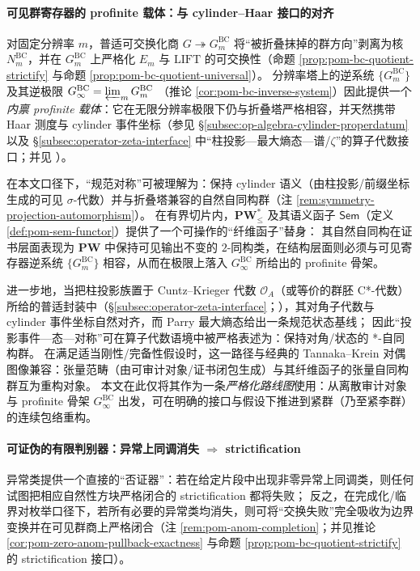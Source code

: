 \paragraph{可见群寄存器的 profinite 载体：与 cylinder--Haar 接口的对齐}
对固定分辨率 \(m\)，普适可交换化商 \(G\twoheadrightarrow G_m^{\mathrm{BC}}\) 将“被折叠抹掉的群方向”剥离为核 \(N_m^{\mathrm{BC}}\)，并在 \(G_m^{\mathrm{BC}}\) 上严格化 \(E_m\) 与 \(\mathrm{LIFT}\) 的可交换性（命题 \ref{prop:pom-bc-quotient-strictify} 与命题 \ref{prop:pom-bc-quotient-universal}）。
分辨率塔上的逆系统 \(\{G_m^{\mathrm{BC}}\}\) 及其逆极限
\(
G_\infty^{\mathrm{BC}}=\varprojlim_m G_m^{\mathrm{BC}}
\)
（推论 \ref{cor:pom-bc-inverse-system}）因此提供一个\emph{内禀 profinite 载体}：它在无限分辨率极限下仍与折叠塔严格相容，并天然携带 Haar 测度与 cylinder 事件坐标（参见 \S\ref{subsec:op-algebra-cylinder-properdatum} 以及 \S\ref{subsec:operator-zeta-interface} 中“柱投影—最大熵态—谱/\(\zeta\)”的算子代数接口；并见 \cite{CuntzKrieger1980}）。

\begin{remark}\label{rem:pom-tannaka-krein-roadmap}
在本文口径下，“规范对称”可被理解为：保持 cylinder 语义（由柱投影/前缀坐标生成的可见 \(\sigma\)-代数）并与折叠塔兼容的自然自同构群（注 \ref{rem:symmetry-projection-automorphism}）。
在有界切片内，\(\mathbf{PW}^{\ast}_{\le}\) 及其语义函子 \(\mathsf{Sem}\)（定义 \ref{def:pom-sem-functor}）提供了一个可操作的“纤维函子”替身：
其自然自同构在证书层面表现为 \(\mathbf{PW}\) 中保持可见输出不变的 \(2\)-同构类，在结构层面则必须与可见寄存器逆系统 \(\{G_m^{\mathrm{BC}}\}\) 相容，从而在极限上落入 \(G_\infty^{\mathrm{BC}}\) 所给出的 profinite 骨架。
\par
进一步地，当把柱投影族置于 Cuntz--Krieger 代数 \(\mathcal{O}_A\)（或等价的群胚 C*-代数）所给的普适封装中（\S\ref{subsec:operator-zeta-interface}；\cite{CuntzKrieger1980}），其对角子代数与 cylinder 事件坐标自然对齐，而 Parry 最大熵态给出一条规范状态基线；
因此“投影事件—态—对称”可在算子代数语境中被严格表述为：保持对角/状态的 *-自同构群。
在满足适当刚性/完备性假设时，这一路径与经典的 Tannaka--Krein 对偶图像兼容：张量范畴（由可审计对象/证书闭包生成）与其纤维函子的张量自同构群互为重构对象。
本文在此仅将其作为一条\emph{严格化路线图}使用：从离散审计对象与 profinite 骨架 \(G_\infty^{\mathrm{BC}}\) 出发，可在明确的接口与假设下推进到紧群（乃至紧李群）的连续包络重构。
\end{remark}

\paragraph{可证伪的有限判别器：异常上同调消失 \texorpdfstring{$\Rightarrow$}{=>} strictification}
异常类提供一个直接的“否证器”：若在给定片段中出现非零异常上同调类，则任何试图把相应自然性方块严格闭合的 strictification 都将失败；
反之，在完成化/临界对枚举口径下，若所有必要的异常类均消失，则可将“交换失败”完全吸收为边界变换并在可见群商上严格闭合（注 \ref{rem:pom-anom-completion}；并见推论 \ref{cor:pom-zero-anom-pullback-exactness} 与命题 \ref{prop:pom-bc-quotient-strictify} 的 strictification 接口）。

